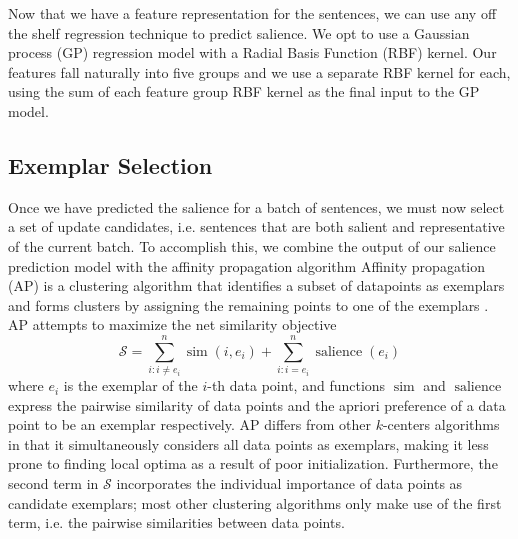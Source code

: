 Now that we have a feature representation for the sentences, we can use
any off the shelf regression technique to predict salience.
We opt to use a Gaussian process (GP) regression model
\cite{rasmussen:gaussian-process-book} with a Radial Basis Function (RBF) 
kernel.  
Our features fall naturally into five groups and we use a separate RBF kernel
for each, using the sum of each feature group RBF kernel as the final input
to the GP model.




\subsection{Exemplar Selection}
\label{sec:exsel}

Once we have predicted the salience for a batch of sentences, we must
now select a set of update candidates, i.e. sentences that are both salient
and representative of the current batch.
To accomplish this, we combine the output of our 
salience prediction model with the affinity
propagation algorithm 
Affinity propagation (AP) is a clustering algorithm
that identifies a subset of datapoints as exemplars and forms clusters
by assigning the remaining points to one of the exemplars 
\cite{frey2007clustering}. AP attempts to 
maximize the net similarity objective 
\[ \mathcal{S} = \sum_{i : i \neq e_i}^n \operatorname{sim}(i,e_i) 
+ \sum_{i : i = e_i}^n \operatorname{salience}(e_i)  \]
where $e_i$ is the exemplar of the $i$-th data point, and functions
$\operatorname{sim}$ and $\operatorname{salience}$ express the pairwise 
similarity
of data points and the apriori preference of a data point to be an exemplar
respectively. 
AP differs from other $k$-centers algorithms in that it simultaneously 
considers all data points as exemplars, making it less prone to finding
local optima as a result of poor initialization. Furthermore, the 
second term in $\mathcal{S}$ incorporates the individual importance of 
data points as candidate exemplars; most other clustering algorithms only make
use of the first term, i.e. the pairwise similarities between data points.
 
